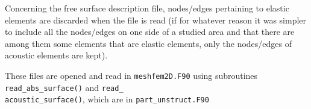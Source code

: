 \documentclass[oneside,english,onecolumn,letterpaper]{book}
\begin{document}
\begin{description}
Concerning the free surface description file, nodes/edges pertaining to
elastic elements are discarded when the file is read (if for whatever
reason it was simpler to include all the nodes/edges on one side of a
studied area and that there are among them some elements that are
elastic elements, only the nodes/edges of acoustic elements are kept).

These files are opened and read in \texttt{meshfem2D.F90} using subroutines
\texttt{read\_abs\_surface()} and \texttt{read\_}~\\
\texttt{acoustic\_surface()}, which are in \texttt{part\_unstruct.F90}





\end{description}


\end{document}
